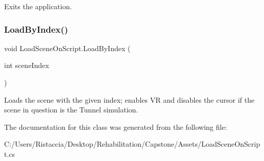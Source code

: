 Exits the application. \mbox{\label{class_load_scene_on_script_a30b6b34844e13a2e1faf70ac09eb9707}} 
\subsubsection{\texorpdfstring{Load\+By\+Index()}{LoadByIndex()}}
{\footnotesize\ttfamily void Load\+Scene\+On\+Script.\+Load\+By\+Index (\begin{DoxyParamCaption}\item[{int}]{scene\+Index }\end{DoxyParamCaption})}

Loads the scene with the given index; enables VR and disables the cursor if the scene in question is the Tunnel simulation. 

The documentation for this class was generated from the following file\+:\begin{DoxyCompactItemize}
\item 
C\+:/\+Users/\+Ristaccia/\+Desktop/\+Rehabilitation/\+Capstone/\+Assets/Load\+Scene\+On\+Script.\+cs\end{DoxyCompactItemize}
